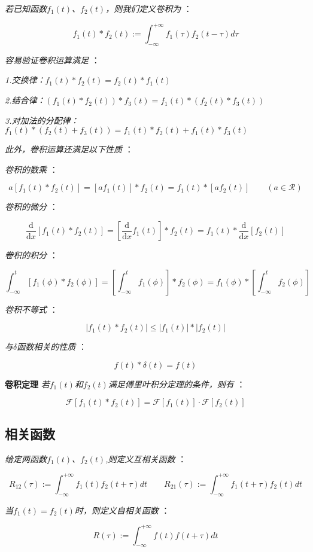 \textit{若已知函数$f_1(t)$、$f_2(t)$，则我们定义卷积为 }：

\[f_1(t)\ast f_2(t):=\int_{-\infty}^{+\infty}f_1(\tau)f_2(t-\tau)d\tau \tag{p}\] 

\textit{容易验证卷积运算满足 }：

\textit{1.交换律：$f_1(t)\ast f_2(t)=f_2(t)\ast f_1(t)$}

\textit{2.结合律：$(f_1(t) \ast f_2(t)) \ast f_3(t)=f_1(t) \ast (f_2(t) \ast f_3(t))$}

\textit{3.对加法的分配律：$f_1(t) \ast (f_2(t)+f_3(t))=f_1(t) \ast f_2(t)+f_1(t) \ast f_3(t)$}

\textit{此外，卷积运算还满足以下性质 } ：

\textit{卷积的数乘 }：

\[a[f_1(t)\ast f_2(t)]=[af_1(t)]\ast f_2(t)=f_1(t)\ast [af_2(t)] \qquad (a \in \mathcal{R})\]

\textit{卷积的微分 }：

\[\frac{\mathrm {d}}{\mathrm {d}x}[f_1(t)\ast f_2(t)]=[\frac{\mathrm {d}}{\mathrm {d}x}f_1(t)]\ast f_2(t)=f_1(t)\ast\frac{\mathrm {d}}{\mathrm {d}x}[ f_2(t)]\]

\textit{卷积的积分 }：

\[\int_{-\infty}^{t}[f_1(\phi)\ast f_2(\phi)]=[\int_{-\infty}^{t}f_1(\phi)]\ast f_2(\phi)=f_1(\phi)\ast [\int_{-\infty}^{t}f_2(\phi)]\]

\textit{卷积不等式 }：

\[|f_1(t)\ast f_2(t)| \leqslant |f_1(t)|\ast |f_2(t)|\]

\textit{与$\delta$函数相关的性质 }：

\[f(t) \ast \delta(t)=f(t)\]

\textbf{卷积定理} \qquad \textit{若$f_1(t)$和$f_2(t)$满足傅里叶积分定理的条件，则有 }：

\[\mathcal{F}[f_1(t) \ast f_2(t)]=\mathcal{F}[f_1(t)] \cdot \mathcal{F}[f_2(t)]\]

\subsection{相关函数}

\textit{给定两函数$f_1(t)$、$f_2(t)$,则定义互相关函数 }：

\[R_{12}(\tau):=\int_{-\infty}^{+\infty}f_1(t)f_2(t+\tau)dt \qquad R_{21}(\tau):=\int_{-\infty}^{+\infty}f_1(t+\tau)f_2(t)dt\]

\textit{当$f_1(t)=f_2(t)$时，则定义自相关函数 }：

\[R(\tau):=\int_{-\infty}^{+\infty}f(t)f(t+\tau)dt\]


